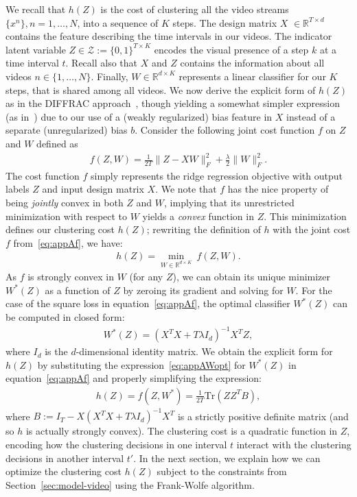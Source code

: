 \documentclass[10pt,twocolumn,letterpaper]{article}
\begin{document}
We recall that $h(Z)$ is the cost of clustering all the video streams $\{x^n\}, n=1,\ldots, N$, into a sequence of $K$ steps. 
The design matrix $X$  $\in \mathbb{R}^{T \times d}$ contains the feature describing the time intervals in our videos.
The indicator latent variable $Z\in \mathcal{Z} := \{0,1\}^{T\times K}$ encodes the visual presence of a step $k$ at a time interval $t$. 
Recall also that $X$ and $Z$ contains the information about all videos $n \in \{1,\ldots, N\}$.
Finally, $W\in \mathbb{R}^{d\times K}$ represents a linear classifier for our $K$ steps, that is shared among all videos. We now derive the explicit form of $h(Z)$ as in the DIFFRAC approach~\cite{Bach07diffrac}, though yielding a somewhat simpler expression (as in~\cite{Bojanowski15weakly}) due to our use of a (weakly regularized) bias feature in $X$ instead of a separate (unregularized) bias $b$. 
Consider the following joint cost function $f$ on $Z$ and $W$ defined as
\begin{align}
f(Z,W) =  \frac{1}{2T} \|Z - X W\|_F^2+ \frac{\lambda}{2} \|W\|_F^2.
\label{eq:appAf}
\end{align}
The cost function $f$ simply represents the ridge regression objective with output labels $Z$ and input design matrix $X$. We note that $f$ has the nice property of being \emph{jointly} convex in both $Z$ and $W$, implying that its unrestricted minimization with respect to $W$ yields a \emph{convex} function in $Z$. This minimization defines our clustering cost $h(Z)$; rewriting the definition of $h$ with the joint cost $f$ from~\eqref{eq:appAf}, we have:
\begin{align}
%
    h(Z) = \min_{W \in \mathbb{R}^{d \times K}} \ f(Z,W).
\label{eq:appAh}
\end{align}
As $f$ is strongly convex in $W$ (for any $Z$), we can obtain its unique minimizer $W^*(Z)$ as a function of $Z$ by zeroing its gradient and solving for $W$.
For the case of the square loss in equation~\eqref{eq:appAf}, the optimal classifier $W^*(Z)$ can be computed in closed form:
\begin{align}
%
%
W^*(Z) =  (X^TX+T\lambda I_d)^{-1}X^TZ, 
\label{eq:appAWopt}
\end{align}
where $I_d$ is the $d$-dimensional identity matrix.
We obtain the explicit form for $h(Z)$ by substituting the expression~\eqref{eq:appAWopt} for $W^*(Z)$ in equation~\eqref{eq:appAf} and properly simplifying the expression:
\begin{align}
h(Z) = f(Z,W^*) = \frac{1}{2T}\text{Tr}(ZZ^TB),
\label{eq:appAexph}
\end{align}
where $B := I_T-X(X^TX+T\lambda I_d)^{-1}X^T$ is a strictly positive definite matrix (and so $h$ is actually strongly convex). The clustering cost is a quadratic function in $Z$, encoding how the clustering decisions in one interval $t$ interact with the clustering decisions in another interval $t'$. In the next section, we explain how we can optimize the clustering cost $h(Z)$ subject to the constraints from Section~\ref{sec:model-video} using the Frank-Wolfe algorithm.
\end{document}
